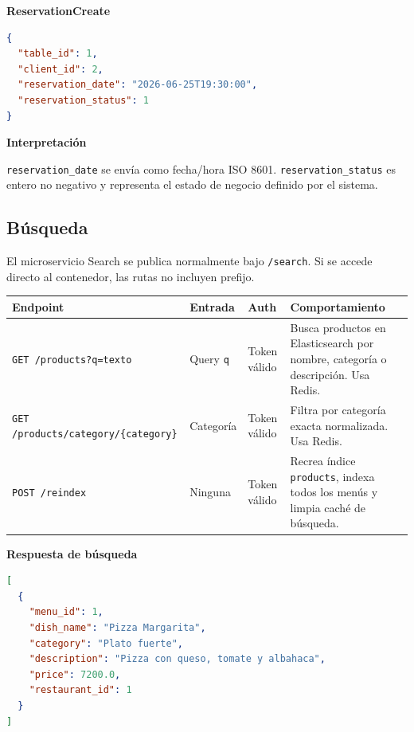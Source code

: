 \documentclass[12pt,letterpaper]{article}
\def\endpoint#1#2{\texttt{#1 #2}}
\def\codefile#1{\nolinkurl{#1}}
\begin{document}
\textbf{ReservationCreate}
\begin{lstlisting}[language=json]
{
  "table_id": 1,
  "client_id": 2,
  "reservation_date": "2026-06-25T19:30:00",
  "reservation_status": 1
}
\end{lstlisting}

\textbf{Interpretación}

\codefile{reservation\_date} se envía como fecha/hora ISO 8601. \codefile{reservation\_status} es entero no negativo y representa el estado de negocio definido por el sistema.

\subsection{Búsqueda}

El microservicio Search se publica normalmente bajo \codefile{/search}. Si se accede directo al contenedor, las rutas no incluyen prefijo.

\small
\begin{tabularx}{\textwidth}{
>{\raggedright\arraybackslash}p{}
>{\raggedright\arraybackslash}p{}
>{\raggedright\arraybackslash}p{}
>{\raggedright\arraybackslash}X
}
\toprule
\textbf{Endpoint} & \textbf{Entrada} & \textbf{Auth} & \textbf{Comportamiento}\\
\midrule
\endpoint{GET}{\codefile{/products?q=texto}} 
& Query \codefile{q} 
& Token válido 
& Busca productos en Elasticsearch por nombre, categoría o descripción. Usa Redis.\\

\endpoint{GET}{\codefile{/products/category/{category}}} 
& Categoría 
& Token válido 
& Filtra por categoría exacta normalizada. Usa Redis.\\

\endpoint{POST}{\codefile{/reindex}} 
& Ninguna 
& Token válido 
& Recrea índice \codefile{products}, indexa todos los menús y limpia caché de búsqueda.\\
\bottomrule
\end{tabularx}

\vspace{0.6cm}

\textbf{Respuesta de búsqueda}
\begin{lstlisting}[language=json]
[
  {
    "menu_id": 1,
    "dish_name": "Pizza Margarita",
    "category": "Plato fuerte",
    "description": "Pizza con queso, tomate y albahaca",
    "price": 7200.0,
    "restaurant_id": 1
  }
]
\end{lstlisting}
\end{document}
